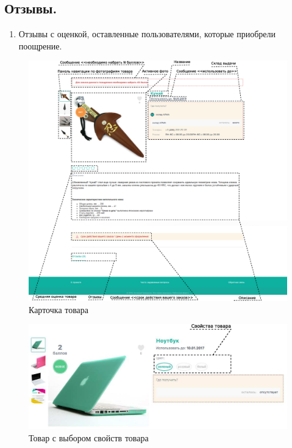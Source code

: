         \subsection{Отзывы.}
            \begin{enumerate}
                \item Отзывы с оценкой, оставленные пользователями, которые приобрели поощрение.
            \end{enumerate}

        \begin{figure}
            \includegraphics[width=170mm]{02_noauth_funcs/figures/07.eps}
            \caption{Карточка товара}
            \label{fig:goods_cart}
        \end{figure} 

        \begin{figure}
            \includegraphics[width=170mm]{02_noauth_funcs/figures/08.eps}
            \caption{Товар с выбором свойств товара}
            \label{fig:goods_cart_props}
        \end{figure} 
        
